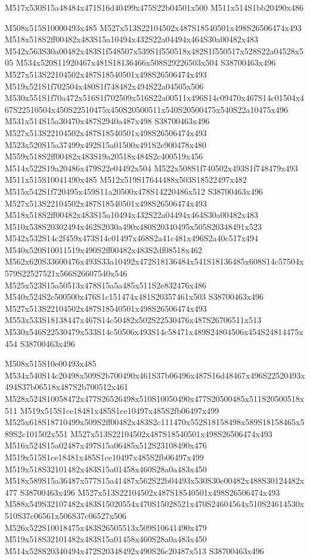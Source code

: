 \documentclass{article}
\begin{document}
\begin{multicols}{2}
\begin{center}
M517x530S15a48484x471S16d40499x475S22b04501x500 M511x514S1bb20490x486 
\end{center}


M508x515S10000493x485 M527x513S22104502x487S18540501x498S26506474x493 M518x518S2ff00482x483S15a10494x432S22a04494x464S30a00482x483 M542x563S30a00482x483S1f548507x539S1f550518x482S1f550517x528S22a04528x505 M534x520S11920467x481S18136466x508S29226503x504 S38700463x496 M527x513S22104502x487S18540501x498S26506474x493 M519x521S1f702504x480S1f748482x494S22a04505x506 M530x551S1f70a472x516S1f702509x516S22a00511x496S14c09470x467S14c01504x467S22510504x450S22510475x450S20500511x540S20500475x540S22a10475x496 M531x514S15a30470x487S2940a487x498 S38700463x496 M527x513S22104502x487S18540501x498S26506474x493 M523x520S15a37499x492S15a01500x491S2e900478x480 M559x518S2ff00482x483S19a20518x484S2c400519x456 M514x522S19a20486x479S22e04492x504 M522x508S1f740502x493S1f748479x493 M511x515S10041490x485 M512x519S17644488x503S18522497x482 M515x542S1f720495x459S11a20500x478S14220486x512 S38700463x496 M527x513S22104502x487S18540501x498S26506474x493 M518x518S2ff00482x483S15a10494x432S22a04494x464S30a00482x483 M510x538S20302494x462S2030a490x480S20340495x505S20348491x523 M542x532S14c2f459x473S14c01497x468S2a41c481x496S2a40c517x494 M540x520S10011519x490S2ff00482x483S2df08518x462 M562x620S33600476x493S33a10492x472S18136484x541S18136485x608S14c57504x579S22527521x566S26607540x546 M525x523S15a50513x478S15a5a485x511S2e832476x486 M540x524S2c500500x476S1c151474x481S20357461x503 S38700463x496 M527x513S22104502x487S18540501x498S26506474x493 M553x533S18138447x467S14c50482x502S22530476x487S26706511x513 M530x546S22530479x533S14c50506x493S14c58471x489S24804506x454S24814475x454 S38700463x496

M508x515S10e00493x485 M534x540S14c20498x509S2b700490x461S37b06496x487S16d48467x496S22520493x494S37b06518x487S2b700512x461 M528x524S10058472x477S26526498x510S10050490x477S20500485x511S20500518x511 M519x515S1ce18481x485S1ce10497x485S2fb06497x499 M525x618S18710499x509S2ff00482x483S2c111470x552S18158498x589S18158465x589S2c101502x551 M527x513S22104502x487S18540501x498S26506474x493 M516x524S15a02487x497S15a06485x512S23108490x476 M519x515S1ce18481x485S1ce10497x485S2fb06497x499 M519x518S32101482x483S15a01458x460S28a0a483x450 M518x589S15a36487x577S15a41487x562S22b04493x530S30e00482x488S30124482x477 S38700463x496 M527x513S22104502x487S18540501x498S26506474x493 M588x549S32107482x483S15020554x470S15028521x470S24604564x510S24614530x510S37c06561x506S37c06527x506 M526x522S10018475x483S26505513x509S10641490x479 M519x518S32101482x483S15a01458x460S28a0a483x450 M514x528S20340494x472S20348492x490S26c20487x513 S38700463x496


\end{multicols}
\end{document}
